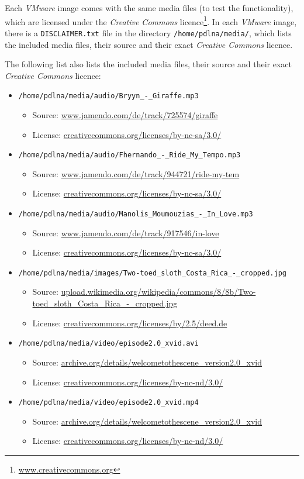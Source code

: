 \documentclass[a4paper,oneside,10pt]{report}
\begin{document}
Each {\em VMware} image comes with the same media files (to test the functionality), which are licensed under the {\em Creative Commons} licence\footnote{\url{www.creativecommons.org}}. In each {\em VMware} image, there is a \verb|DISCLAIMER.txt| file in the directory \verb|/home/pdlna/media/|, which lists the included media files, their source and their exact {\em Creative Commons} licence.

The following list also lists the included media files, their source and their exact {\em Creative Commons} licence:
\begin{itemize}
	\item \verb|/home/pdlna/media/audio/Bryyn_-_Giraffe.mp3|
	\begin{itemize}
		\item Source: \url{www.jamendo.com/de/track/725574/giraffe}
		\item License: \url{creativecommons.org/licenses/by-nc-sa/3.0/}
	\end{itemize}
	\item \verb|/home/pdlna/media/audio/Fhernando_-_Ride_My_Tempo.mp3|
	\begin{itemize}
		\item Source: \url{www.jamendo.com/de/track/944721/ride-my-tem}
		\item License: \url{creativecommons.org/licenses/by-nc-sa/3.0/}
	\end{itemize}
	\item \verb|/home/pdlna/media/audio/Manolis_Moumouzias_-_In_Love.mp3|
	\begin{itemize}
		\item Source: \url{www.jamendo.com/de/track/917546/in-love}
		\item License: \url{creativecommons.org/licenses/by-nc-sa/3.0/}
	\end{itemize}
	\item \verb|/home/pdlna/media/images/Two-toed_sloth_Costa_Rica_-_cropped.jpg|
	\begin{itemize}
		\item Source: \url{upload.wikimedia.org/wikipedia/commons/8/8b/Two-toed_sloth_Costa_Rica_-_cropped.jpg}
		\item License: \url{creativecommons.org/licenses/by/2.5/deed.de}
	\end{itemize}
	\item \verb|/home/pdlna/media/video/episode2.0_xvid.avi|
	\begin{itemize}
		\item Source: \url{archive.org/details/welcometothescene_version2.0_xvid}
		\item License: \url{creativecommons.org/licenses/by-nc-nd/3.0/}
	\end{itemize}
	\item \verb|/home/pdlna/media/video/episode2.0_xvid.mp4|
	\begin{itemize}
		\item Source: \url{archive.org/details/welcometothescene_version2.0_xvid}
		\item License: \url{creativecommons.org/licenses/by-nc-nd/3.0/}
	\end{itemize}
\end{itemize}
\end{document}
